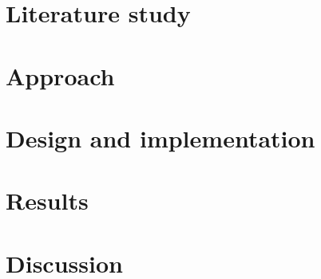 \documentclass{epr400}
\begin{document}
\renewcommand{\eprthepartname}{Design and implementation}
\section{Literature study}
\renewcommand{\eprthepartname}{Literature study}

\clearpage
\section{Approach}
\renewcommand{\eprthepartname}{Approach}

\clearpage
\renewcommand{\eprthepartname}{Design and implementation}
\section{Design and implementation}

\clearpage
\renewcommand{\eprthepartname}{Results}
\section{Results}

\clearpage
\renewcommand{\eprthepartname}{Discussion}
\section{Discussion}

\clearpage
\renewcommand{\eprthepartname}{References}


\clearpage\appendix
\renewcommand{\eprthepartname}{Supporting evidence}

\clearpage

\clearpage

\end{document}
